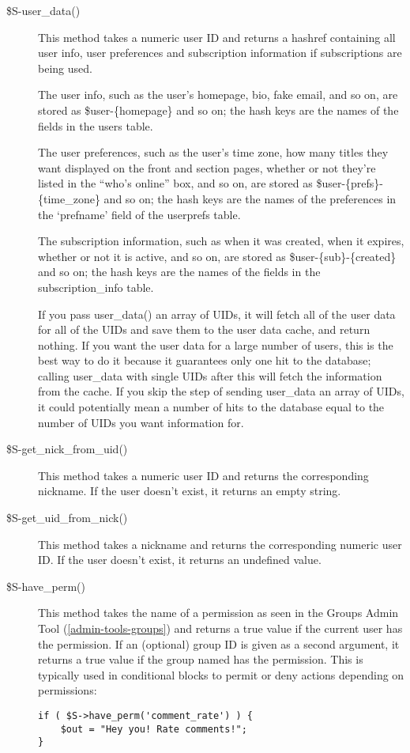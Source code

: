 \begin{description}
\item[\$S-\latexhtml{$>$}{>}user\_data()] This method takes a numeric user ID and returns a hashref containing all user info, user preferences and subscription information if subscriptions are being used. 

The user info, such as the user's homepage, bio, fake email, and so on, are stored as \$user-\latexhtml{$>$}{>}\{homepage\} and so on; the hash keys are the names of the fields in the users table. 

The user preferences, such as the user's time zone, how many titles they want displayed on the front and section pages, whether or not they're listed in the ``who's online'' box, and so on, are stored as \$user-\latexhtml{$>$}{>}\{prefs\}-\latexhtml{$>$}{>}\{time\_zone\} and so on; the hash keys are the names of the preferences in the `prefname' field of the userprefs table.

The subscription information, such as when it was created, when it expires, whether or not it is active, and so on, are stored as \$user-\latexhtml{$>$}{>}\{sub\}-\latexhtml{$>$}{>}\{created\} and so on; the hash keys are the names of the fields in the subscription\_info table.

If you pass user\_data() an array of UIDs, it will fetch all of the user data for all of the UIDs and save them to the user data cache, and return nothing. If you want the user data for a large number of users, this is the best way to do it because it guarantees only one hit to the database; calling user\_data with single UIDs after this will fetch the information from the cache. If you skip the step of sending user\_data an array of UIDs, it could potentially mean a number of hits to the database equal to the number of UIDs you want information for.

\item[\$S-\latexhtml{$>$}{>}get\_nick\_from\_uid()] This method takes a numeric user ID and returns the corresponding nickname. If the user doesn't exist, it returns an empty string.

\item[\$S-\latexhtml{$>$}{>}get\_uid\_from\_nick()] This method takes a nickname and returns the corresponding numeric user ID. If the user doesn't exist, it returns an undefined value.

\item[\$S-\latexhtml{$>$}{>}have\_perm()] This method takes the name of a permission as seen in the Groups Admin Tool (\ref{admin-tools-groups}) and returns a true value if the current user has the permission. If an (optional) group ID is given as a second argument, it returns a true value if the group named has the permission. This is typically used in conditional blocks to permit or deny actions depending on permissions:
\begin{verbatim}
if ( $S->have_perm('comment_rate') ) {
	$out = "Hey you! Rate comments!";
}
\end{verbatim}


\end{description}
